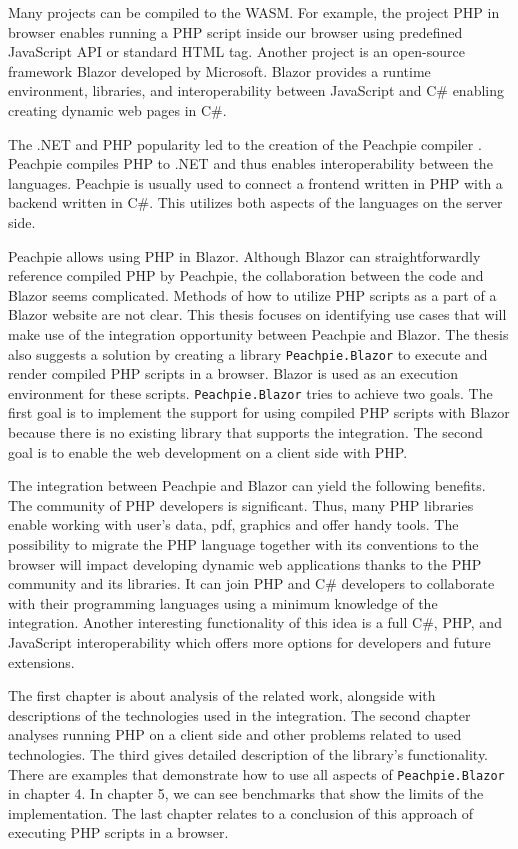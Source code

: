 \par
Many projects can be compiled to the WASM.
For example, the project PHP in browser \cite{online:pib} enables running a PHP script inside our browser using predefined JavaScript API or standard HTML tag.
Another project is an open-source framework Blazor \cite{online:blazor} developed by Microsoft.
Blazor provides a runtime environment, libraries, and interoperability between JavaScript and C\# enabling creating dynamic web pages in C\#.
\par
The .NET and PHP popularity led to the creation of the Peachpie compiler \cite{online:peachpie}.
Peachpie compiles PHP to .NET and thus enables interoperability between the languages.
Peachpie is usually used to connect a frontend written in PHP with a backend written in C\#. This utilizes both aspects of the languages on the server side.
\par
Peachpie allows using PHP in Blazor.
Although Blazor can straightforwardly reference compiled PHP by Peachpie, the collaboration between the code and Blazor seems complicated.
Methods of how to utilize PHP scripts as a part of a Blazor website are not clear. 
This thesis focuses on identifying use cases that will make use of the integration opportunity between Peachpie and Blazor. The thesis also suggests a solution by creating a library \texttt{Peachpie.Blazor} to execute and render compiled PHP scripts in a browser.
Blazor is used as an execution environment for these scripts.
\texttt{Peachpie.Blazor} tries to achieve two goals.
The first goal is to implement the support for using compiled PHP scripts with Blazor because there is no existing library that supports the integration.
The second goal is to enable the web development on a client side with PHP.
\par
The integration between Peachpie and Blazor can yield the following benefits.
The community of PHP developers is significant.
Thus, many PHP libraries enable working with user's data, pdf, graphics and offer handy tools.
The possibility to migrate the PHP language together with its conventions to the browser will impact developing dynamic web applications thanks to the PHP community and its libraries.
It can join PHP and C\# developers to collaborate with their programming languages using a minimum knowledge of the integration.
Another interesting functionality of this idea is a full C\#, PHP, and JavaScript interoperability which offers more options for developers and future extensions.
\par
The first chapter is about analysis of the related work, alongside with descriptions of the technologies used in the integration.
The second chapter analyses running PHP on a client side and other problems related to used technologies.
The third gives detailed description of the library's functionality.
There are examples that demonstrate how to use all aspects of \texttt{Peachpie.Blazor} in chapter 4.
In chapter 5, we can see benchmarks that show the limits of the implementation.
The last chapter relates to a conclusion of this approach of executing PHP scripts in a browser.
